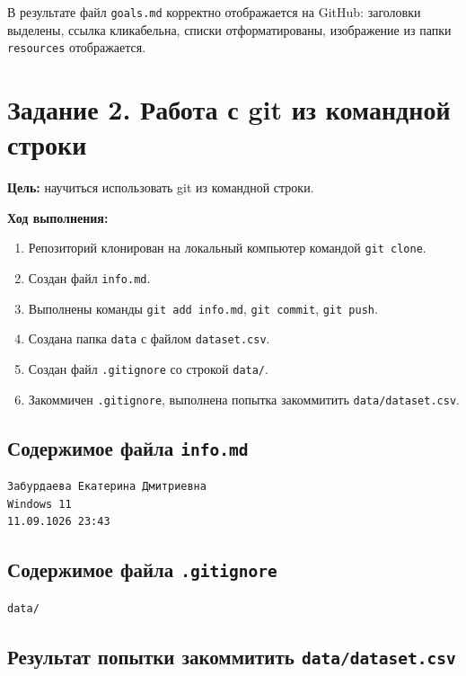 \documentclass[a4paper, 12pt]{article}
\begin{document}
В результате файл \texttt{goals.md} корректно отображается на GitHub: заголовки выделены, ссылка кликабельна, списки отформатированы, изображение из папки \texttt{resources} отображается.

\newpage
\section{Задание 2. Работа с git из командной строки}

\textbf{Цель:} научиться использовать git из командной строки.

\textbf{Ход выполнения:}
\begin{enumerate}
    \item Репозиторий клонирован на локальный компьютер командой \texttt{git clone}.
    \item Создан файл \texttt{info.md}.
    \item Выполнены команды \texttt{git add info.md}, \texttt{git commit}, \texttt{git push}.
    \item Создана папка \texttt{data} с файлом \texttt{dataset.csv}.
    \item Создан файл \texttt{.gitignore} со строкой \texttt{data/}.
    \item Закоммичен \texttt{.gitignore}, выполнена попытка закоммитить \texttt{data/dataset.csv}.
\end{enumerate}

\subsection{Содержимое файла \texttt{info.md}}

\begin{lstlisting}[language=Markdown, caption={Файл info.md}, label=lst:info]
Забурдаева Екатерина Дмитриевна
Windows 11
11.09.1026 23:43
\end{lstlisting}

\subsection{Содержимое файла \texttt{.gitignore}}

\begin{lstlisting}[language=Markdown, caption={Файл .gitignore}, label=lst:gitignore]
data/
\end{lstlisting}

\subsection{Результат попытки закоммитить \texttt{data/dataset.csv}}
\end{document}
